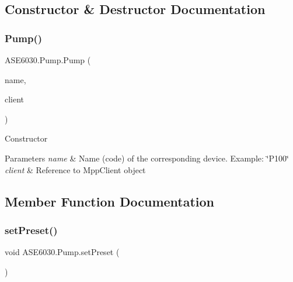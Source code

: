 \subsection{Constructor \& Destructor Documentation}
\mbox{\label{class_a_s_e6030_1_1_pump_ac23356a1375f9dc895beeb922721635d}} 
\subsubsection{\texorpdfstring{Pump()}{Pump()}}
{\footnotesize\ttfamily A\+S\+E6030.\+Pump.\+Pump (\begin{DoxyParamCaption}\item[{String}]{name,  }\item[{ref Tut.\+Mpp\+Opc\+Ua\+Client\+Lib.\+Mpp\+Client}]{client }\end{DoxyParamCaption})\hspace{0.3cm}{\ttfamily [inline]}}



Constructor 


\begin{DoxyParams}{Parameters}
{\em name} & Name (code) of the corresponding device. Example\+: \char`\"{}\+P100\char`\"{}\\
\hline
{\em client} & Reference to Mpp\+Client object\\
\hline
\end{DoxyParams}


\subsection{Member Function Documentation}
\mbox{\label{class_a_s_e6030_1_1_pump_a25c0c51e6e9fbddecdf94f3523b971ad}} 
\subsubsection{\texorpdfstring{set\+Preset()}{setPreset()}}
{\footnotesize\ttfamily void A\+S\+E6030.\+Pump.\+set\+Preset (\begin{DoxyParamCaption}{ }\end{DoxyParamCaption})\hspace{0.3cm}{\ttfamily [inline]}}



